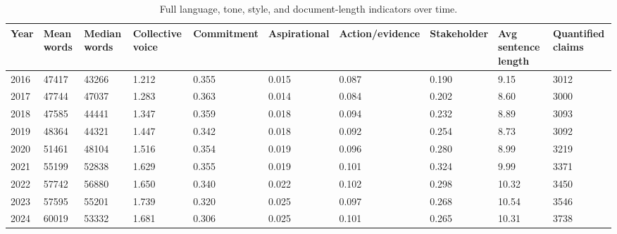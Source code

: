 \begin{table}[htbp]
\centering
\caption{Full language, tone, style, and document-length indicators over time.}
\label{tab:language_tone_over_time}
\begin{tabular}{llllllllll}
\hline
Year & Mean words & Median words & Collective voice & Commitment & Aspirational & Action/evidence & Stakeholder & Avg sentence length & Quantified claims \\
\hline
2016 & 47417 & 43266 & 1.212 & 0.355 & 0.015 & 0.087 & 0.190 & 9.15 & 3012 \\
2017 & 47744 & 47037 & 1.283 & 0.363 & 0.014 & 0.084 & 0.202 & 8.60 & 3000 \\
2018 & 47585 & 44441 & 1.347 & 0.359 & 0.018 & 0.094 & 0.232 & 8.89 & 3093 \\
2019 & 48364 & 44321 & 1.447 & 0.342 & 0.018 & 0.092 & 0.254 & 8.73 & 3092 \\
2020 & 51461 & 48104 & 1.516 & 0.354 & 0.019 & 0.096 & 0.280 & 8.99 & 3219 \\
2021 & 55199 & 52838 & 1.629 & 0.355 & 0.019 & 0.101 & 0.324 & 9.99 & 3371 \\
2022 & 57742 & 56880 & 1.650 & 0.340 & 0.022 & 0.102 & 0.298 & 10.32 & 3450 \\
2023 & 57595 & 55201 & 1.739 & 0.320 & 0.025 & 0.097 & 0.268 & 10.54 & 3546 \\
2024 & 60019 & 53332 & 1.681 & 0.306 & 0.025 & 0.101 & 0.265 & 10.31 & 3738 \\
\hline
\end{tabular}
\end{table}

